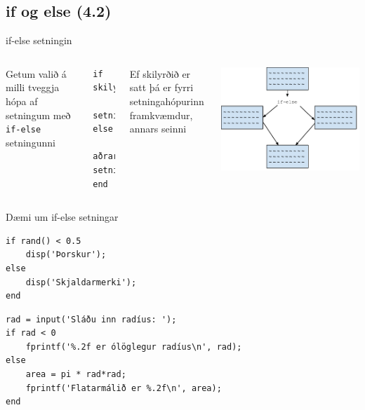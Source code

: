 \documentclass{beamer}
\begin{document}
\subsection{if og else (4.2)}

\begin{frame}[fragile]{if-else setningin}
\begin{columns}
Getum valið á milli tveggja hópa af setningum með \texttt{if-else} setningunni
\begin{verbatim}
if skilyrði
    setningar
else
    aðrar setningar
end
\end{verbatim}
Ef skilyrðið er satt þá er fyrri setningahópurinn framkvæmdur, annars seinni
\begin{center}
 \includegraphics[width=\linewidth]{Pics/if-else}
\end{center}
\end{columns}
\end{frame}

\begin{frame}[fragile]{Dæmi um if-else setningar}
\begin{verbatim}
if rand() < 0.5
    disp('Þorskur');
else
    disp('Skjaldarmerki');
end
\end{verbatim}

\begin{verbatim}
rad = input('Sláðu inn radíus: ');
if rad < 0
    fprintf('%.2f er ólöglegur radíus\n', rad);
else
    area = pi * rad*rad;
    fprintf('Flatarmálið er %.2f\n', area);
end
\end{verbatim}
\end{frame}
\end{document}
